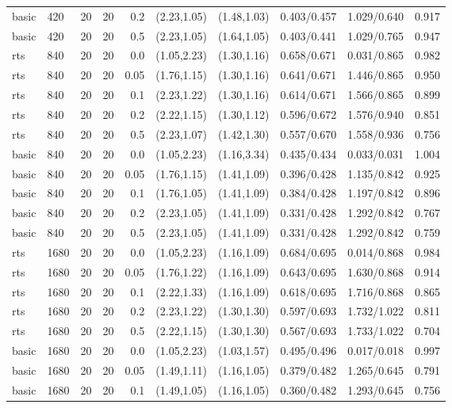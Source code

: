 \begin{tabular}{llrrrccccc}
basic & 420 & 20 & 20 & 0.2 & (2.23,1.05) & (1.48,1.03) & 0.403/0.457 & 1.029/0.640 & 0.917 \\
basic & 420 & 20 & 20 & 0.5 & (2.23,1.05) & (1.64,1.05) & 0.403/0.441 & 1.029/0.765 & 0.947 \\
rts & 840 & 20 & 20 & 0.0 & (1.05,2.23) & (1.30,1.16) & 0.658/0.671 & 0.031/0.865 & 0.982 \\
rts & 840 & 20 & 20 & 0.05 & (1.76,1.15) & (1.30,1.16) & 0.641/0.671 & 1.446/0.865 & 0.950 \\
rts & 840 & 20 & 20 & 0.1 & (2.23,1.22) & (1.30,1.16) & 0.614/0.671 & 1.566/0.865 & 0.899 \\
rts & 840 & 20 & 20 & 0.2 & (2.22,1.15) & (1.30,1.12) & 0.596/0.672 & 1.576/0.940 & 0.851 \\
rts & 840 & 20 & 20 & 0.5 & (2.23,1.07) & (1.42,1.30) & 0.557/0.670 & 1.558/0.936 & 0.756 \\
basic & 840 & 20 & 20 & 0.0 & (1.05,2.23) & (1.16,3.34) & 0.435/0.434 & 0.033/0.031 & 1.004 \\
basic & 840 & 20 & 20 & 0.05 & (1.76,1.15) & (1.41,1.09) & 0.396/0.428 & 1.135/0.842 & 0.925 \\
basic & 840 & 20 & 20 & 0.1 & (1.76,1.05) & (1.41,1.09) & 0.384/0.428 & 1.197/0.842 & 0.896 \\
basic & 840 & 20 & 20 & 0.2 & (2.23,1.05) & (1.41,1.09) & 0.331/0.428 & 1.292/0.842 & 0.767 \\
basic & 840 & 20 & 20 & 0.5 & (2.23,1.05) & (1.41,1.09) & 0.331/0.428 & 1.292/0.842 & 0.759 \\
rts & 1680 & 20 & 20 & 0.0 & (1.05,2.23) & (1.16,1.09) & 0.684/0.695 & 0.014/0.868 & 0.984 \\
rts & 1680 & 20 & 20 & 0.05 & (1.76,1.22) & (1.16,1.09) & 0.643/0.695 & 1.630/0.868 & 0.914 \\
rts & 1680 & 20 & 20 & 0.1 & (2.22,1.33) & (1.16,1.09) & 0.618/0.695 & 1.716/0.868 & 0.865 \\
rts & 1680 & 20 & 20 & 0.2 & (2.23,1.22) & (1.30,1.30) & 0.597/0.693 & 1.732/1.022 & 0.811 \\
rts & 1680 & 20 & 20 & 0.5 & (2.22,1.15) & (1.30,1.30) & 0.567/0.693 & 1.733/1.022 & 0.704 \\
basic & 1680 & 20 & 20 & 0.0 & (1.05,2.23) & (1.03,1.57) & 0.495/0.496 & 0.017/0.018 & 0.997 \\
basic & 1680 & 20 & 20 & 0.05 & (1.49,1.11) & (1.16,1.05) & 0.379/0.482 & 1.265/0.645 & 0.791 \\
basic & 1680 & 20 & 20 & 0.1 & (1.49,1.05) & (1.16,1.05) & 0.360/0.482 & 1.293/0.645 & 0.756 \\

\end{tabular}
